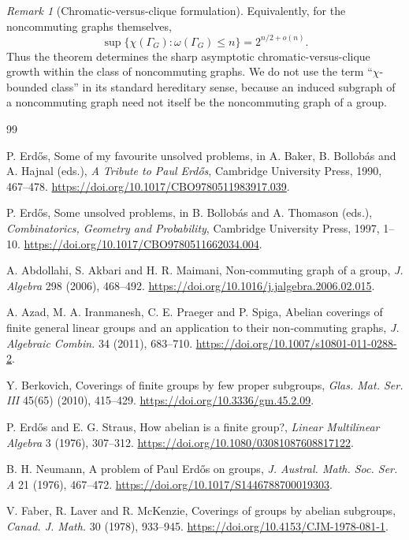 \documentclass[11pt]{article}
\theoremstyle{definition}
\theoremstyle{remark}
\newtheorem{remark}[theorem]{Remark}
\begin{document}
\begin{remark}[Chromatic-versus-clique formulation]
Equivalently, for the noncommuting graphs themselves,
\[
\sup\{\chi(\Gamma_G):\omega(\Gamma_G)\le n\}=2^{n/2+o(n)}.
\]
Thus the theorem determines the sharp asymptotic chromatic-versus-clique growth within the class of noncommuting graphs. We do not use the term ``$\chi$-bounded class'' in its standard hereditary sense, because an induced subgraph of a noncommuting graph need not itself be the noncommuting graph of a group.
\end{remark}

\begin{thebibliography}{99}

P. Erd\H{o}s, Some of my favourite unsolved problems, in A. Baker, B. Bollob\'as and A. Hajnal (eds.), \emph{A Tribute to Paul Erd\H{o}s}, Cambridge University Press, 1990, 467--478. \url{https://doi.org/10.1017/CBO9780511983917.039}.

P. Erd\H{o}s, Some unsolved problems, in B. Bollob\'as and A. Thomason (eds.), \emph{Combinatorics, Geometry and Probability}, Cambridge University Press, 1997, 1--10. \url{https://doi.org/10.1017/CBO9780511662034.004}.

A. Abdollahi, S. Akbari and H. R. Maimani, Non-commuting graph of a group, \emph{J. Algebra} 298 (2006), 468--492. \url{https://doi.org/10.1016/j.jalgebra.2006.02.015}.

A. Azad, M. A. Iranmanesh, C. E. Praeger and P. Spiga, Abelian coverings of finite general linear groups and an application to their non-commuting graphs, \emph{J. Algebraic Combin.} 34 (2011), 683--710. \url{https://doi.org/10.1007/s10801-011-0288-2}.

Y. Berkovich, Coverings of finite groups by few proper subgroups, \emph{Glas. Mat. Ser. III} 45(65) (2010), 415--429. \url{https://doi.org/10.3336/gm.45.2.09}.

P. Erd\H{o}s and E. G. Straus, How abelian is a finite group?, \emph{Linear Multilinear Algebra} 3 (1976), 307--312. \url{https://doi.org/10.1080/03081087608817122}.

B. H. Neumann, A problem of Paul Erd\H{o}s on groups, \emph{J. Austral. Math. Soc. Ser. A} 21 (1976), 467--472. \url{https://doi.org/10.1017/S1446788700019303}.

V. Faber, R. Laver and R. McKenzie, Coverings of groups by abelian subgroups, \emph{Canad. J. Math.} 30 (1978), 933--945. \url{https://doi.org/10.4153/CJM-1978-081-1}.


\end{thebibliography}
\end{document}
